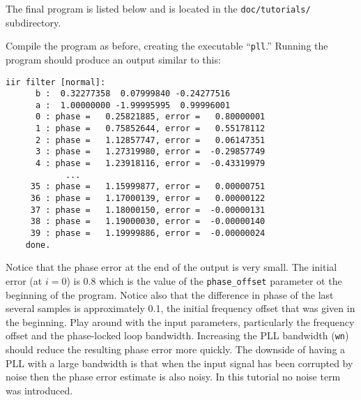 The final program is listed below and is located in the
{\tt doc/tutorials/} subdirectory.
%

%
Compile the program as before, creating the executable ``{\tt pll}.''
Running the program should produce an output similar to this:
\begin{Verbatim}[fontsize=\small]
    iir filter [normal]:
      b :  0.32277358  0.07999840 -0.24277516
      a :  1.00000000 -1.99995995  0.99996001
      0 : phase =   0.25821885, error =   0.80000001
      1 : phase =   0.75852644, error =   0.55178112
      2 : phase =   1.12857747, error =   0.06147351
      3 : phase =   1.27319980, error =  -0.29857749
      4 : phase =   1.23918116, error =  -0.43319979
            ...
     35 : phase =   1.15999877, error =   0.00000751
     36 : phase =   1.17000139, error =   0.00000122
     37 : phase =   1.18000150, error =  -0.00000131
     38 : phase =   1.19000030, error =  -0.00000140
     39 : phase =   1.19999886, error =  -0.00000024
    done.
\end{Verbatim}
%
Notice that the phase error at the end of the output is very small.
The initial error (at $i=0$) is 0.8 which is the value of the
{\tt phase\_offset} parameter ot the beginning of the program.
Notice also that the difference in phase of the last several samples is
approximately 0.1, the initial frequency offset that was given in the
beginning.
Play around with the input parameters, particularly the frequency offset
and the phase-locked loop bandwidth.
Increasing the PLL bandwidth ({\tt wn}) should reduce the resulting
phase error more quickly.
The downside of having a PLL with a large bandwidth is that when the
input signal has been corrupted by noise then the phase error estimate
is also noisy.
In this tutorial no noise term was introduced. %

